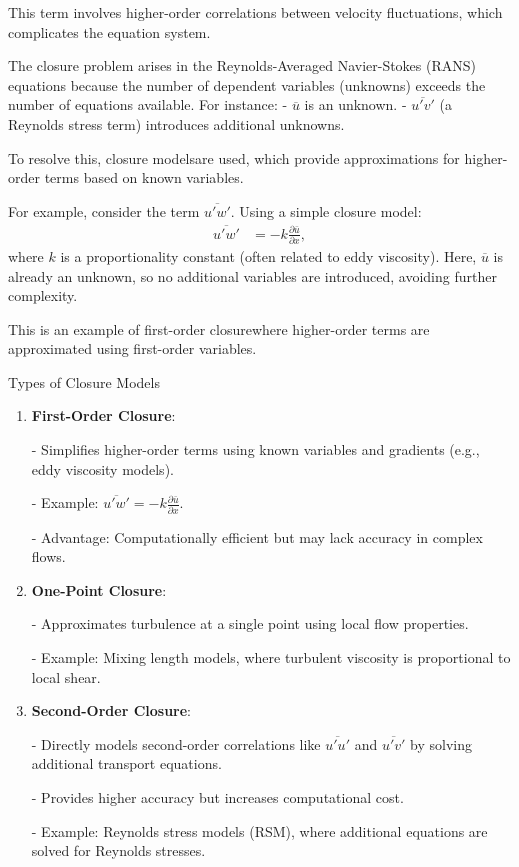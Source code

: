 \documentclass[fleqn,10pt]{SelfArx} %
\begin{document}
This term involves higher-order correlations between velocity fluctuations, which complicates the equation system.

The closure problem arises in the Reynolds-Averaged Navier-Stokes (RANS) equations because the number of dependent variables (unknowns) exceeds the number of equations available. For instance:
- $\overline{u}$ is an unknown.
- $\overline{u'v'}$ (a Reynolds stress term) introduces additional unknowns.

To resolve this, closure modelsare used, which provide approximations for higher-order terms based on known variables.

For example, consider the term $\overline{u'w'}$. Using a simple closure model:
\begin{align*}
	\overline{u'w'} & = -k \frac{\partial \bar{u}}{\partial x},
\end{align*}
where $k$ is a proportionality constant (often related to eddy viscosity). Here, $\overline{u}$ is already an unknown, so no additional variables are introduced, avoiding further complexity.

This is an example of first-order closurewhere higher-order terms are approximated using first-order variables.

Types of Closure Models
\begin{enumerate}[noitemsep]
	\item \textbf{First-Order Closure}:

	      - Simplifies higher-order terms using known variables and gradients (e.g., eddy viscosity models).

	      - Example: $\overline{u'w'} = -k \frac{\partial \bar{u}}{\partial x}$.

	      - Advantage: Computationally efficient but may lack accuracy in complex flows.
	\item \textbf{One-Point Closure}:

	      - Approximates turbulence at a single point using local flow properties.

	      - Example: Mixing length models, where turbulent viscosity is proportional to local shear.
	\item \textbf{Second-Order Closure}:

	      - Directly models second-order correlations like $\overline{u'u'}$ and $\overline{u'v'}$ by solving additional transport equations.

	      - Provides higher accuracy but increases computational cost.

	      - Example: Reynolds stress models (RSM), where additional equations are solved for Reynolds stresses.
\end{enumerate}
\end{document}
